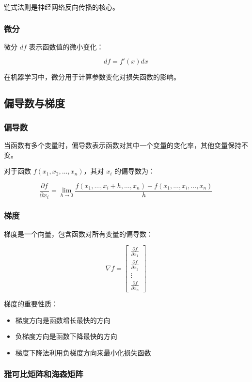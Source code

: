 \documentclass[12pt,UTF8]{ctexbook}
\begin{document}
链式法则是神经网络反向传播的核心。

\subsubsection{微分}

微分 $df$ 表示函数值的微小变化：

$$df = f'(x) dx$$

在机器学习中，微分用于计算参数变化对损失函数的影响。

\subsection{偏导数与梯度}

\subsubsection{偏导数}

当函数有多个变量时，偏导数表示函数对其中一个变量的变化率，其他变量保持不变。

对于函数 $f(x_1, x_2, \dots, x_n)$，其对 $x_i$ 的偏导数为：

$$\frac{\partial f}{\partial x_i} = \lim_{h \to 0} \frac{f(x_1, \dots, x_i+h, \dots, x_n) - f(x_1, \dots, x_i, \dots, x_n)}{h}$$

\subsubsection{梯度}

梯度是一个向量，包含函数对所有变量的偏导数：

$$\nabla f = \begin{bmatrix} \frac{\partial f}{\partial x_1} \\ \frac{\partial f}{\partial x_2} \\ \vdots \\ \frac{\partial f}{\partial x_n} \end{bmatrix}$$

梯度的重要性质：
\begin{itemize}[leftmargin=2cm]
    \item 梯度方向是函数增长最快的方向
    \item 负梯度方向是函数下降最快的方向
    \item 梯度下降法利用负梯度方向来最小化损失函数
\end{itemize}

\subsubsection{雅可比矩阵和海森矩阵}
\end{document}
